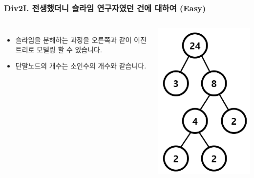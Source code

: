 \documentclass[xetex]{beamer}
\begin{document}
\begin{frame}
  \frametitle{Div2I. 전생했더니 슬라임 연구자였던 건에 대하여 (Easy)}
  \begin{columns}
      \begin{itemize}
        \item 슬라임을 분해하는 과정을 오른쪽과 같이 이진트리로 모델링 할 수 있습니다.
        \item 단말노드의 개수는 소인수의 개수와 같습니다.
      \end{itemize}
      \includegraphics[width=1\textwidth]{slime-sol-0.png}
  \end{columns}
\end{frame}
\end{document}

